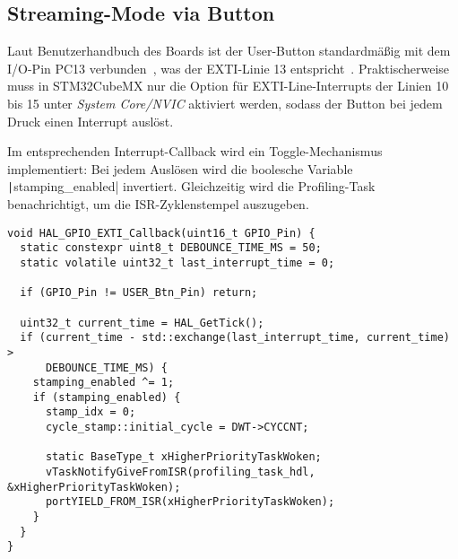 
\subsection{Streaming-Mode via Button}

Laut Benutzerhandbuch des Boards ist der User-Button standardmäßig mit dem
I/O-Pin PC13 verbunden~\cite[S. 24, 6.6]{stm32_nucleo144_user_manual}, was der
EXTI-Linie 13 entspricht~\cite[S. 322, 11.8]{stm32f7_ref_manual}.
Praktischerweise muss in STM32CubeMX nur die Option für EXTI-Line-Interrupts der
Linien 10 bis 15 unter \textit{System Core/NVIC} aktiviert werden, sodass der
Button bei jedem Druck einen Interrupt auslöst.

Im entsprechenden Interrupt-Callback wird ein Toggle-Mechanismus implementiert:
Bei jedem Auslösen wird die boolesche Variable
\texttt|stamping_enabled| invertiert. Gleichzeitig wird die
Profiling-Task benachrichtigt, um die ISR-Zyklenstempel auszugeben.


\begin{code}
\begin{verbatim}
void HAL_GPIO_EXTI_Callback(uint16_t GPIO_Pin) {
  static constexpr uint8_t DEBOUNCE_TIME_MS = 50;
  static volatile uint32_t last_interrupt_time = 0;

  if (GPIO_Pin != USER_Btn_Pin) return;

  uint32_t current_time = HAL_GetTick();
  if (current_time - std::exchange(last_interrupt_time, current_time) >
      DEBOUNCE_TIME_MS) {
    stamping_enabled ^= 1;
    if (stamping_enabled) {
      stamp_idx = 0;
      cycle_stamp::initial_cycle = DWT->CYCCNT;

      static BaseType_t xHigherPriorityTaskWoken;
      vTaskNotifyGiveFromISR(profiling_task_hdl, &xHigherPriorityTaskWoken);
      portYIELD_FROM_ISR(xHigherPriorityTaskWoken);
    }
  }
}
\end{verbatim}
\end{code}

